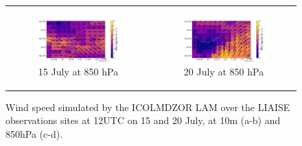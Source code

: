 \begin{figure}[hbtp]
\begin{tabular}{cc}
        \begin{subfigure}[t]{0.5\textwidth}
            \caption{15 July at 850 hPa}
            \includegraphics[width=\textwidth]{images/chap6/IOP_maps/lmdz_wind850_2021-07-15_12UTC.png}
        \end{subfigure} &
        \begin{subfigure}[t]{0.5\textwidth}
            \caption{20 July at 850 hPa}
            \includegraphics[width=\textwidth]{images/chap6/IOP_maps/lmdz_wind850_2021-07-20_12UTC.png}
        \end{subfigure} \\
    \end{tabular}
    \caption{Wind speed simulated by the ICOLMDZOR LAM over the LIAISE observations sites at 12UTC on 15 and 20 July, at 10m (a-b) and 850hPa (c-d).}
    \label{fig:iop_days_LMDZ_winds}
\end{figure}
\clearpage

